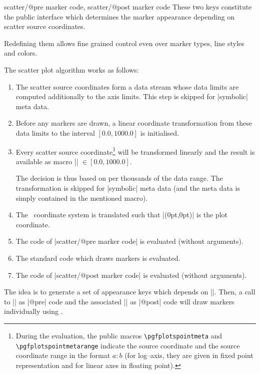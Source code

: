 {\begin{pgfplotsxycodekeylist}{
	scatter/@pre marker code,
	scatter/@post marker code}
	These two keys constitute the public interface which determines the marker appearance depending on scatter source coordinates.

	Redefining them allows fine grained control even over marker types, line styles and colors.

	The scatter plot algorithm works as follows:
\begin{enumerate} 
\item The scatter source coordinates form a data stream whose data limits are computed additionally to the axis limits. This step is skipped for |symbolic| meta data.
\item Before any markers are drawn, a linear coordinate transformation from these data limits to the interval $[0.0,1000.0]$ is initialised. 
\item Every scatter source coordinate\footnote{During the evaluation, the public macros \texttt{\textbackslash pgfplotspointmeta} and \texttt{\textbackslash pgfplotspointmetarange} indicate the source coordinate and the source coordinate range in the format $a:b$ (for log--axis, they are given in fixed point representation and for linear axes in floating point).} will be transformed linearly and the result is available as macro |\pgfplotspointmetatransformed| $ \in [0.0,1000.0]$.

The decision is thus based on per thousands of the data range. The transformation is skipped for |symbolic| meta data (and the meta data is simply contained in the mentioned macro).
\item The \pgfname\ coordinate system is translated such that |(0pt,0pt)| is the plot coordinate.
\item The code of |scatter/@pre marker code| is evaluated (without arguments).
\item The standard code which draws markers is evaluated.
\item The code of |scatter/@post marker code| is evaluated (without arguments).
\end{enumerate}
	The idea is to generate a set of appearance keys which depends on |\pgfplotspointmetatransformed|. Then, a call to |\scope| as |@pre| code and the associated |\endscope| as |@post| code will draw markers individually using .


\end{pgfplotsxycodekeylist}}
